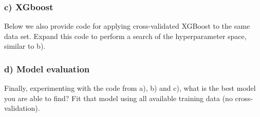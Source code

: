 \documentclass[
]{article}
\newenvironment{Shaded}{\begin{snugshade}}{\end{snugshade}}
\newcommand{\AttributeTok}[1]{\textcolor[rgb]{0.13,0.29,0.53}{#1}}
\newcommand{\CommentTok}[1]{\textcolor[rgb]{0.56,0.35,0.01}{\textit{#1}}}
\newcommand{\ConstantTok}[1]{\textcolor[rgb]{0.56,0.35,0.01}{#1}}
\newcommand{\DecValTok}[1]{\textcolor[rgb]{0.00,0.00,0.81}{#1}}
\newcommand{\FloatTok}[1]{\textcolor[rgb]{0.00,0.00,0.81}{#1}}
\newcommand{\FunctionTok}[1]{\textcolor[rgb]{0.13,0.29,0.53}{\textbf{#1}}}
\newcommand{\NormalTok}[1]{#1}
\newcommand{\OtherTok}[1]{\textcolor[rgb]{0.56,0.35,0.01}{#1}}
\newcommand{\SpecialCharTok}[1]{\textcolor[rgb]{0.81,0.36,0.00}{\textbf{#1}}}
\begin{document}
\subsubsection{c) XGboost}\label{c-xgboost}

Below we also provide code for applying cross-validated XGBoost to the
same data set. Expand this code to perform a search of the
hyperparameter space, similar to b).

\begin{Shaded}
\end{Shaded}

\subsubsection{d) Model evaluation}\label{d-model-evaluation}

Finally, experimenting with the code from a), b) and c), what is the
best model you are able to find? Fit that model using all available
training data (no cross-validation).
\end{document}
